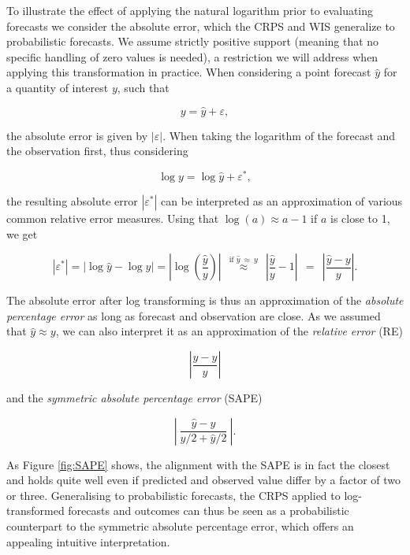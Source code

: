 \documentclass{article}
\begin{document}
To illustrate the effect of applying the natural logarithm prior to evaluating forecasts we consider the absolute error, which the CRPS and WIS generalize to probabilistic forecasts. We assume strictly positive support (meaning that no specific handling of zero values is needed), a restriction we will address when applying this transformation in practice. When considering a point forecast $\hat{y}$ for a quantity of interest $y$, such that 
%
\begin{linenomath*}
\begin{equation}
y = \hat{y} + \varepsilon,
\end{equation}
\end{linenomath*}
the absolute error is given by $|\varepsilon|$. When taking the logarithm of the forecast and the observation first, thus considering 
\begin{linenomath*}
\begin{equation}
\log y = \log \hat{y} + \varepsilon^*,
\end{equation}
\end{linenomath*}
the resulting absolute error $\left|\varepsilon^*\right|$ can be interpreted as an approximation of various common relative error measures. Using that $\log(a) \approx a - 1$ if $a$ is close to 1, we get
\begin{linenomath*}
\begin{equation}
|\varepsilon^*| = |\log \hat{y} - \log y| = \left|\log\left(\frac{\hat{y}}{y}\right) \right| \ \ \stackrel{\text{if } \hat{y} \ \approx \ y}{\approx} \ \ \left| \frac{\hat{y}}{y} - 1 \right| \ \ = \ \ \left| \frac{\hat{y} - y}{y} \right|.
\end{equation}
\end{linenomath*}
The absolute error after log transforming is thus an approximation of the \textit{absolute percentage error} \citep[APE,][]{gneitingMakingEvaluatingPoint2011a} as long as forecast and observation are close. As we assumed that $\hat{y} \approx y$, we can also interpret it as an approximation of the \textit{relative error} (RE)
\begin{linenomath*}
\begin{equation}
\left| \frac{\hat{y} - y}{\hat{y}} \right|
\end{equation}
\end{linenomath*}
and the \textit{symmetric absolute percentage error} (SAPE)
\begin{linenomath*}
\begin{equation}
\left| \ \frac{\hat{y} - y}{y/2 + \hat{y}/2} \ \right|.
\end{equation}
\end{linenomath*}
As Figure \ref{fig:SAPE} shows, the alignment with the SAPE is in fact the closest and holds quite well even if predicted and observed value differ by a factor of two or three. Generalising to probabilistic forecasts, the CRPS applied to log-transformed forecasts and outcomes can thus be seen as a probabilistic counterpart to the symmetric absolute percentage error, which offers an appealing intuitive interpretation.
\end{document}
